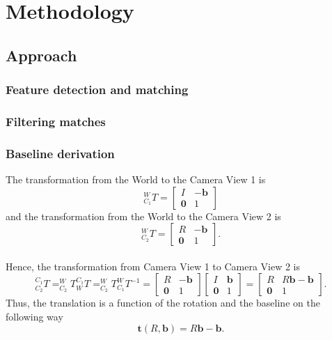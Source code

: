 
\chapter{Methodology}
\label{methodology}

\section{Approach}

\subsection{Feature detection and matching}

\subsection{Filtering matches}

\subsection{Baseline derivation}

The transformation from the World to the Camera View 1 is
\begin{equation}
^W_{C_1}T = \begin{bmatrix}
I & -\mathbf{b}\\ 
\mathbf{0} & 1
\end{bmatrix}
\end{equation} and the transformation from the World to the Camera View 2 is
\begin{equation}
^W_{C_2}T = \begin{bmatrix}
R & -\mathbf{b}\\ 
\mathbf{0} & 1
\end{bmatrix}.
\end{equation}\\

Hence, the transformation from Camera View 1 to Camera View 2 is 
\begin{equation}
^{C_1}_{C_2}T = ^{W}_{C_2}T ^{C_1}_{W}T = ^{W}_{C_2}T ^{W}_{C_1}T^{-1} = 
\begin{bmatrix}
R & -\mathbf{b}\\ 
\mathbf{0} & 1
\end{bmatrix}
\begin{bmatrix}
I & \mathbf{b}\\ 
\mathbf{0} & 1
\end{bmatrix}
=
\begin{bmatrix}
R & R\mathbf{b}-\mathbf{b}\\ 
\mathbf{0} & 1
\end{bmatrix}.
\end{equation}
Thus, the translation is a function of the rotation and the baseline on the following way 
\begin{equation}
\mathbf{t}(R, \mathbf{b}) = R\mathbf{b}-\mathbf{b}.
\end{equation}


